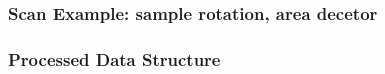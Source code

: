 \documentclass{beamer}
\begin{document}
\begin{frame} \frametitle{Scan Example: sample rotation, area decetor}
\begin{figure}[!ht]
\end{figure}
\end{frame}


\begin{frame} \frametitle{Processed Data Structure}
\begin{figure}[!ht]
\end{figure}
\end{frame}
\end{document}

